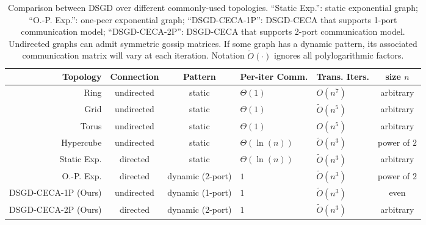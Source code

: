 \documentclass{article}
\theoremstyle{plain}
\theoremstyle{definition}
\begin{document}
\begin{table*}[t]
	    \centering 
		\caption{\small Comparison between DSGD over different commonly-used topologies. ``Static Exp.'': static exponential graph; ``O.-P. Exp.'': one-peer exponential graph; 
  ``DSGD-CECA-1P'': DSGD-CECA that supports 1-port communication model; ``DSGD-CECA-2P'': DSGD-CECA that supports 2-port communication model. 
  Undirected graphs can admit symmetric gossip matrices. If some graph has a  dynamic pattern, its associated communication matrix will vary at each iteration. Notation $\tilde{O}(\cdot)$ ignores all polylogarithmic factors.}
		\begin{tabular}{rccllc}
			\toprule
			\textbf{Topology} & \textbf{Connection} & \textbf{Pattern} & \textbf{Per-iter Comm.} & \hspace{-2mm}\textbf{Trans. Iters.} & \textbf{size $n$}\\ \midrule
			Ring \cite{nedic2018network}              & undirected          &                static                         &            $\Theta(1)$                &\hspace{-2mm}   $O(n^7)$                 &  arbitrary  \\ 
			Grid \cite{nedic2018network}              & undirected          &                static                         &            $\Theta(1)$                &\hspace{-2mm}   $\tilde{O}(n^5)$                 &   arbitrary \\ 
			Torus \cite{nedic2018network}              & undirected          &          static                               &         $\Theta(1)$                   &\hspace{-2mm}     ${O}(n^5)$              &   arbitrary   \\ 
			Hypercube \cite{trevisan2017lecture}              &undirected           &            static                             &       $\Theta(\ln(n))$                   &\hspace{-2mm}       $\tilde{O}(n^3)$         &      power of $2$     \\ 
			Static Exp.\cite{ying2021exponential} & directed &  static      & $\Theta(\ln(n))$         &\hspace{-2mm} $\tilde{O}(n^3)$   &  arbitrary\\
			O.-P. Exp.\cite{ying2021exponential} & directed &  dynamic (2-port)      & $1 $         &\hspace{-2mm} $\tilde{O}(n^3)$ & power of $2$ \\
			{\color{blue}DSGD-CECA-1P (Ours)} & {\color{blue}undirected} & {\color{blue}dynamic (1-port)}& {\color{blue}$1$}&\hspace{-2mm}    {\color{blue}$\tilde{O}(n^3)$}      & {\color{blue}even}\\
			{\color{blue}DSGD-CECA-2P (Ours)} & {\color{blue}directed} & {\color{blue}dynamic (2-port)} & {\color{blue}$1$}         &\hspace{-2mm} {\color{blue}$\tilde{O}(n^3)$}  & {\color{blue}arbitrary}\\
			\bottomrule
		\end{tabular}
		\label{Table:Summary}
	\end{table*}
\end{document}
